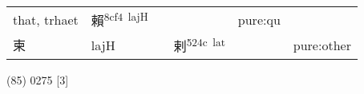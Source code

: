 \documentclass[14pt,a4paper]{scrartcl}
\begin{document}
\begin{longtable}[c]{@{}llllll@{}}
\begin{minipage}[t]{0.14\columnwidth}\raggedright\strut
that, trhaet
\strut\end{minipage} &
\begin{minipage}[t]{0.14\columnwidth}\raggedright\strut
賴\textsuperscript{8cf4~lajH}
\strut\end{minipage} &
\begin{minipage}[t]{0.14\columnwidth}\raggedright\strut
\strut\end{minipage} &
\begin{minipage}[t]{0.14\columnwidth}\raggedright\strut
\strut\end{minipage} &
\begin{minipage}[t]{0.14\columnwidth}\raggedright\strut
pure:qu
\strut\end{minipage}\tabularnewline
\begin{minipage}[t]{0.14\columnwidth}\raggedright\strut
柬
\strut\end{minipage} &
\begin{minipage}[t]{0.14\columnwidth}\raggedright\strut
lajH
\strut\end{minipage} &
\begin{minipage}[t]{0.14\columnwidth}\raggedright\strut
\strut\end{minipage} &
\begin{minipage}[t]{0.14\columnwidth}\raggedright\strut
剌\textsuperscript{524c~lat}
\strut\end{minipage} &
\begin{minipage}[t]{0.14\columnwidth}\raggedright\strut
\strut\end{minipage} &
\begin{minipage}[t]{0.14\columnwidth}\raggedright\strut
pure:other
\strut\end{minipage}\tabularnewline
\bottomrule
\end{longtable}

(85) 0275 {[}3{]}
\end{document}
